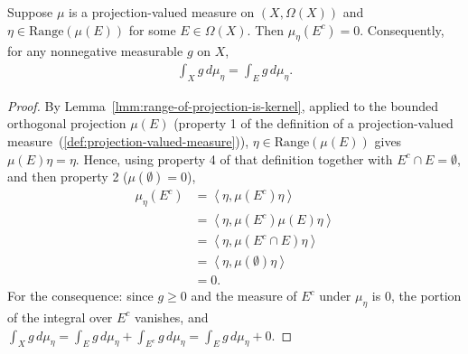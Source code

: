 \begin{lemma}
    \label{lmm:range-membership-concentrates-measure}
    \leanok
    Suppose $\mu$ is a projection-valued measure on $(X,\Omega(X))$ and $\eta \in \text{Range}(\mu(E))$ for some $E \in \Omega(X)$. Then $\mu_\eta(E^c) = 0$. Consequently, for any nonnegative measurable $g$ on $X$,
    \begin{align}
        \int_X g \, d\mu_\eta = \int_E g \, d\mu_\eta.
    \end{align}
\end{lemma}
\begin{proof}
    \leanok
By Lemma~\ref{lmm:range-of-projection-is-kernel}, applied to the bounded orthogonal projection $\mu(E)$ (property 1 of the definition of a projection-valued measure~(\ref{def:projection-valued-measure})), $\eta \in \text{Range}(\mu(E))$ gives $\mu(E)\eta = \eta$. Hence, using property 4 of that definition together with $E^c \cap E = \emptyset$, and then property 2 ($\mu(\emptyset) = 0$),
\begin{align}
    \mu_\eta(E^c) &= \left< \eta, \mu(E^c)\eta \right> \\
                &= \left< \eta, \mu(E^c)\mu(E)\eta \right> \\
                &= \left< \eta, \mu(E^c \cap E)\eta \right> \\
                &= \left< \eta, \mu(\emptyset)\eta \right> \\
                &= 0.
\end{align}
For the consequence: since $g \ge 0$ and the measure of $E^c$ under $\mu_\eta$ is $0$, the portion of the integral over $E^c$ vanishes, and $\int_X g\,d\mu_\eta = \int_E g\,d\mu_\eta + \int_{E^c} g\,d\mu_\eta = \int_E g\,d\mu_\eta + 0$.
\end{proof}

